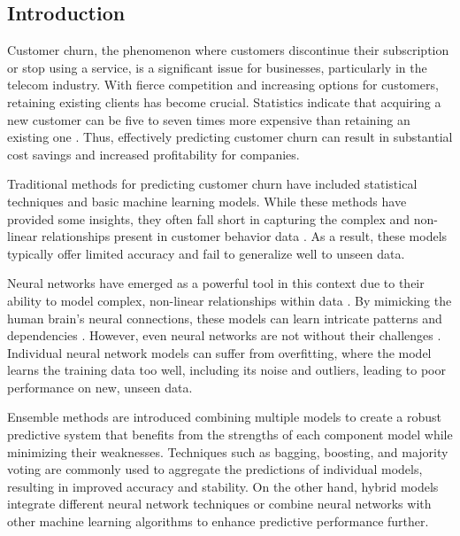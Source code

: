 \subsection{Introduction} {
Customer churn, the phenomenon where customers discontinue their subscription or stop using a service, is a significant issue for businesses, particularly in the telecom industry. With fierce competition and increasing options for customers, retaining existing clients has become crucial. Statistics indicate that acquiring a new customer can be five to seven times more expensive than retaining an existing one \cite{8667113}
. Thus, effectively predicting customer churn can result in substantial cost savings and increased profitability for companies.

Traditional methods for predicting customer churn have included statistical techniques and basic machine learning models. While these methods have provided some insights, they often fall short in capturing the complex and non-linear relationships present in customer behavior data \cite{TSAI200912547}. As a result, these models typically offer limited accuracy and fail to generalize well to unseen data.

Neural networks have emerged as a powerful tool in this context due to their ability to model complex, non-linear relationships within data \cite{8667113}. By mimicking the human brain's neural connections, these models can learn intricate patterns and dependencies \cite{Jesan2003}. However, even neural networks are not without their challenges \cite{Agrawal2018}. Individual neural network models can suffer from overfitting, where the model learns the training data too well, including its noise and outliers, leading to poor performance on new, unseen data\cite{8538420}.

Ensemble methods are introduced combining multiple models to create a robust predictive system that benefits from the strengths of each component model while minimizing their weaknesses\cite{8667113}. Techniques such as bagging, boosting, and majority voting are commonly used to aggregate the predictions of individual models, resulting in improved accuracy and stability. On the other hand, hybrid models integrate different neural network techniques or combine neural networks with other machine learning algorithms to enhance predictive performance further\cite{TSAI200912547}.


}
